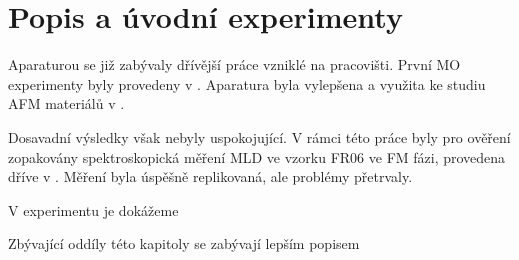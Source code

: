 \section{Popis a úvodní experimenty}
\label{chap:vychozi-situace}

Aparaturou se již zabývaly dřívější práce vzniklé na pracovišti.
První MO experimenty byly provedeny v \cite{wohlrathMagnetooptickaCharakterizaceSpintronickych2018}. 
Aparatura byla vylepšena a využita ke studiu AFM materiálů v \cite{kubascikMagnetooptickeStudiumAntiferomagnetickych2019,kimakOptickaSpektroskopieAntiferomagnetu2019}.

Dosavadní výsledky však nebyly uspokojující.
V rámci této práce byly pro ověření zopakovány spektroskopická měření MLD ve vzorku FR06 ve FM fázi, provedena dříve v \cite{kubascikMagnetooptickeStudiumAntiferomagnetickych2019}.
Měření byla úspěšně replikovaná, ale problémy přetrvaly.

V experimentu je dokážeme


Zbývající oddíly této kapitoly se zabývají lepším popisem
